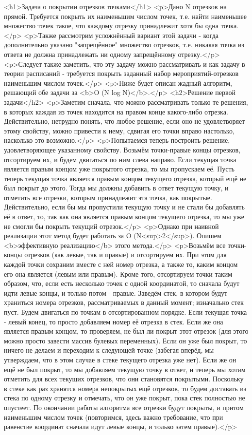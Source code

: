<h1>Задача о покрытии отрезков точками</h1>
<p>Дано N отрезков на прямой. Требуется покрыть их наименьшим числом точек, т.е. найти наименьшее множество точек такое, что каждому отрезку принадлежит хотя бы одна точка.</p>
<p>Также рассмотрим усложнённый вариант этой задачи - когда дополнительно указано "запрещённое" множество отрезков, т.е. никакая точка из ответа не должна принадлежать ни одному запрещённому отрезку.</p>
<p>Следует также заметить, что эту задачу можно рассматривать и как задачу в теории расписаний - требуется покрыть заданный набор мероприятий-отрезков наименьшим числом точек.</p>
<p>Ниже будет описан жадный алгоритм, решающий обе задачи за <b>O (N log N)</b>.</p>
<h2>Решение первой задачи</h2>
<p>Заметим сначала, что можно рассматривать только те решения, в которых каждая из точек находится на правом конце какого-либо отрезка. Действительно, нетрудно понять, что любое решение, если оно не удовлетворяет этому свойству, можно привести к нему, сдвигая его точки вправо настолько, насколько это возможно.</p>
<p>Попытаемся теперь построить решение, удовлетворяющее указанному свойству. Возьмём точки-правые концы отрезков, отсортируем их, и будем двигаться по ним слева направо. Если текущая точка является правым концом уже покрытого отрезка, то мы пропускаем её. Пусть теперь текущая точка является правым концом текущего отрезка, который ещё не был покрыт до этого. Тогда мы должны добавить в ответ текущую точку, и отметить все отрезки, которым принадлежит эта точка, как покрытые. Действительно, если бы мы пропустили текущую точку и не стали бы добавлять её в ответ, то, так как она является правым концом текущего отрезка, то мы уже не смогли бы покрыть текущий отрезок.</p>
<p>Однако при наивной реализации этот метод будет работать за O (N<sup>2</sup>). Опишем <b>эффективную реализацию</b> этого метода.</p>
<p>Возьмём все точки-концы отрезков (как левые, так и правые) и отсортируем их. При этом для каждой точки сохраним вместе с ней номер отрезка, а также то, каким концом его она является (левым или правым). Кроме того, отсортируем точки таким образом, что, если есть несколько точек с одной координатой, то сначала будут идти левые концы, и только потом - правые. Заведём стек, в котором будут храниться номера отрезков, рассматриваемых в данный момент; изначально стек пуст. Будем двигаться по точкам в отсортированном порядке. Если текущая точка - левый конец, то просто добавляем номер её отрезка в стек. Если же она является правым концом, то проверяем, не был ли покрыт этот отрезок (для этого можно просто завести массив булевых переменных). Если он уже был покрыт, то ничего не делаем и переходим к следующей точке (забегая вперёд, мы утверждаем, что в этом случае в стеке текущего отрезка уже нет). Если же он ещё не был покрыт, то мы добавляем текущую точку в ответ, и теперь мы хотим отметить для всех текущих отрезков, что они становятся покрытыми. Поскольку в стеке как раз хранятся номера непокрытых ещё отрезков, то будем доставать из стека по одному отрезку и отмечать, что он уже покрыт, пока стек полностью не опустеет. По окончании работы алгоритма все отрезки будут покрыты, и притом наименьшим числом точек (повторимся, здесь важно требование, что при равенстве координат сначала идут левые концы, и только затем правые).</p>
